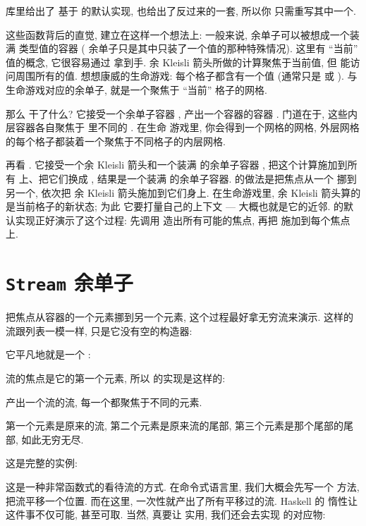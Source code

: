 库里给出了  基于  的默认实现, 也给出了反过来的一套, 所以你
只需重写其中一个.

这些函数背后的直觉, 建立在这样一个想法上: 一般来说, 余单子可以被想成一个装满 
类型值的容器 ( 余单子只是其中只装了一个值的那种特殊情况). 这里有 ``当前''
值的概念, 它很容易通过  拿到手. 余 Kleisli 箭头所做的计算聚焦于当前值, 但
能访问周围所有的值. 想想康威的生命游戏: 每个格子都含有一个值 (通常只是  或
). 与生命游戏对应的余单子, 就是一个聚焦于 ``当前'' 格子的网格.

那么  干了什么? 它接受一个余单子容器 , 产出一个容器的容器
. 门道在于, 这些内层容器各自聚焦于  里不同的 . 在生命
游戏里, 你会得到一个网格的网格, 外层网格的每个格子都装着一个聚焦于不同格子的内层网格.

再看 . 它接受一个余 Kleisli 箭头和一个装满  的余单子容器
, 把这个计算施加到所有  上、把它们换成 , 结果是一个装满
 的余单子容器.  的做法是把焦点从一个  挪到另一个, 依次把
余 Kleisli 箭头施加到它们身上. 在生命游戏里, 余 Kleisli 箭头算的是当前格子的新状态; 为此
它要打量自己的上下文 --- 大概也就是它的近邻.  的默认实现正好演示了这个过程:
先调用  造出所有可能的焦点, 再把  施加到每个焦点上.

\section{\texttt{Stream} 余单子}

把焦点从容器的一个元素挪到另一个元素, 这个过程最好拿无穷流来演示. 这样的流跟列表一模一样,
只是它没有空的构造器:

它平凡地就是一个 :

流的焦点是它的第一个元素, 所以  的实现是这样的:

 产出一个流的流, 每一个都聚焦于不同的元素.

第一个元素是原来的流, 第二个元素是原来流的尾部, 第三个元素是那个尾部的尾部, 如此无穷无尽.

这是完整的实例:

这是一种非常函数式的看待流的方式. 在命令式语言里, 我们大概会先写一个  方法,
把流平移一个位置. 而在这里,  一次性就产出了所有平移过的流. Haskell 的
惰性让这件事不仅可能, 甚至可取. 当然, 真要让  实用, 我们还会去实现
 的对应物:

